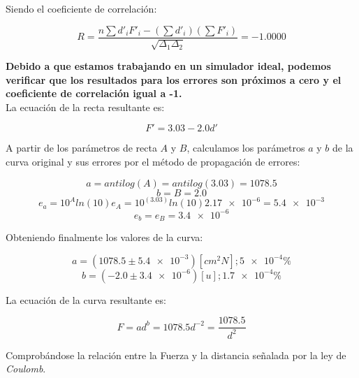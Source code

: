 \documentclass[letter,11pt]{article}
\begin{document}
Siendo el coeficiente de correlación:

\begin{equation*}
    R = \frac{n \sum d'_i F'_i - (\sum d'_i)(\sum F'_i)}{\sqrt{\Delta_1 \Delta_2}} = -1.0000
\end{equation*}

\textbf{Debido a que estamos trabajando en un simulador ideal, podemos verificar
que los resultados para los errores son próximos a cero y el coeficiente de
correlación igual a -1.}
\\

La ecuación de la recta resultante es:

\begin{equation*}
    F' = 3.03 - 2.0 d'
\end{equation*}

A partir de los parámetros de recta $A$ y $B$, calculamos los parámetros $a$ y
$b$ de la curva original y sus errores por el método de propagación de errores:

\begin{equation*}
    a = antilog(A) = antilog(3.03) = 1078.5
\end{equation*}
\begin{equation*}
    b = B = 2.0
\end{equation*}
\begin{equation*}
    e_a = 10^A ln(10) e_A = 10^{(3.03)} ln(10) \num{2.17e-6} = \num{5.4e-3}
\end{equation*}
\begin{equation*}
    e_b = e_B = \num{3.4e-6}
\end{equation*}

Obteniendo finalmente los valores de la curva:

\begin{equation*}
    a = (1078.5 \pm \num{5.4e-3})[cm^2 N]; \num{5e-4}\%
\end{equation*}
\begin{equation*}
    b = (-2.0 \pm \num{3.4e-6})[u]; \num{1.7e-4}\%
\end{equation*}

La ecuación de la curva resultante es:

\begin{equation}
    F = a d^b = 1078.5 d^{-2} = \frac{1078.5}{d^2}
\label{curva}
\end{equation}

Comprobándose la relación entre la Fuerza y la distancia señalada por la ley de
\emph{Coulomb}.
\end{document}
